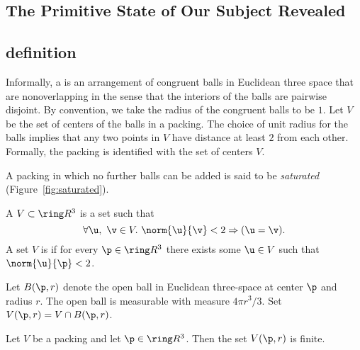 \begin{cnl}
\section{The Primitive State of Our Subject Revealed}\label{primitive state}


\subsection{definition}\label{definition}

Informally, a  is an arrangement of congruent balls
in Euclidean three space that are nonoverlapping in the sense that the
interiors of the balls are pairwise disjoint.  By convention, we take
the radius of the congruent balls to be $1$.
Let $ V$ be the set of centers of the balls in a packing. The choice
of unit radius for the balls implies that any two points in $ V$ have
distance at least $2$ from each other.  Formally, the packing is
identified with the set of centers $V$.  
%

A packing in which no further balls can be added is said to be {\it
saturated} (Figure~\ref{fig:saturated}).

\figDEQCVQL %


\begin{definition}
\label{def:packing,saturated}
A  $ V\subset \vecR{3}$ is a set such that
\[ 
\forall  \u,~\v\in  V.~  \norm{ \u}{\v} < 2 \Rightarrow ( \u=\v).
\]  
A set $V$ is  if for every $\p\in\vecR{3}$ there
exists some $ \u\in V$ such that $\norm{ \u}{\p}< 2$.
\end{definition}



Let $\openBall{\p}{r}$ denote the open ball in
Euclidean three-space at center $\p$ and radius $r$.  The open ball
is measurable with measure $4\pi r^3/3$.
 Set $ \Vee{V}(\p,r) = V \cap
\openBall{\p}{r}$. 
%
%
%

\begin{lemma}
\label{lemma:V-finite}
Let $ V$ be a packing and let $\p\in\vecR{3}$.
Then the set $ \Vee{V}(\p,r)$ is finite.
\end{lemma}


\end{cnl}
